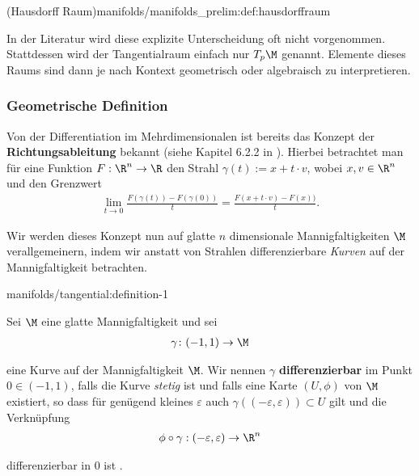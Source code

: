 \documentclass[letterpaper,10pt,english]{jupyterBook}
\begin{document}
\begin{definition}{(Hausdorff Raum)}{manifolds/manifolds_prelim:def:hausdorffraum}
\begin{emphBox}{}{}
\par
In der Literatur wird diese explizite Unterscheidung oft nicht vorgenommen.
Stattdessen wird der Tangentialraum einfach nur \(T_p\M\) genannt.
Elemente dieses Raums sind dann je nach Kontext geometrisch oder algebraisch zu interpretieren.
\end{emphBox}


\subsubsection{Geometrische Definition}
\label{\detokenize{manifolds/tangential:geometrische-definition}}
\par
Von der Differentiation im Mehrdimensionalen ist bereits das Konzept der \textbf{Richtungsableitung} bekannt (siehe Kapitel 6.2.2 in \cite{Ten21}).
Hierbei betrachtet man für eine Funktion \(F:\R^n\to\R\) den Strahl \(\gamma(t):= x + t\cdot v\), wobei \(x,v\in\R^n\) und den Grenzwert
\begin{align*}
\lim_{t\to 0} \frac{F(\gamma(t)) - F(\gamma(0))}{t} = \frac{F(x + t\cdot v) - F(x))}{t}.
\end{align*}
\par
Wir werden dieses Konzept nun auf glatte \(n\) dimensionale Mannigfaltigkeiten \(\M\) verallgemeinern, indem wir anstatt von Strahlen differenzierbare \emph{Kurven} auf der Mannigfaltigkeit betrachten.
\begin{definition}{}{manifolds/tangential:definition-1}



\par
Sei \(\M\) eine glatte Mannigfaltigkeit und sei
\begin{align*}
\gamma \colon (-1,1) \rightarrow \M
\end{align*}
\par
eine Kurve auf der Mannigfaltigkeit \(\M\).
Wir nennen \(\gamma\) \textbf{differenzierbar} im Punkt \(0\in(-1,1)\), falls die Kurve \emph{stetig} ist und falls eine Karte \((U,\phi)\) von \(\M\) existiert, so dass für genügend kleines \(\varepsilon\) auch \(\gamma((-\varepsilon,\varepsilon))\subset U\) gilt und die Verknüpfung
\begin{align*}
\phi \circ \gamma:(-\varepsilon,\varepsilon)\to\R^n
\end{align*}
\par
differenzierbar in \(0\) ist .
\end{definition}


\end{definition}
\end{document}
